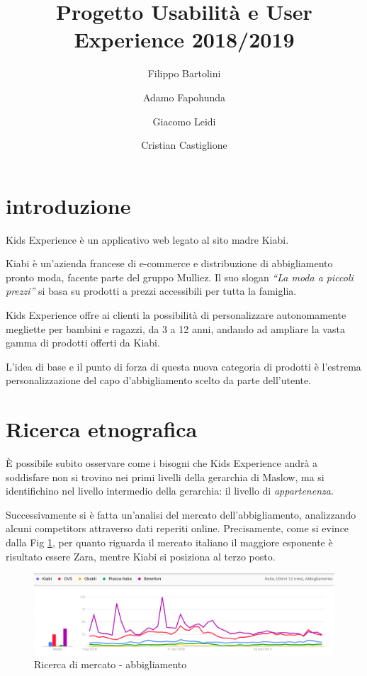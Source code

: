 \documentclass[12pt,italian,]{report}
\title{Progetto Usabilità e User Experience 2018/2019}
\author{Filippo Bartolini \and Adamo Fapohunda \and Giacomo Leidi \and Cristian Castiglione}
\date{}
\begin{document}
\maketitle

{
\setcounter{tocdepth}{2}
\tableofcontents
}
\section{introduzione}\label{introduzione}
Kids Experience è un applicativo web legato al sito madre Kiabi.

Kiabi è un'azienda francese di e-commerce e distribuzione di
abbigliamento pronto moda, facente parte del gruppo Mulliez. Il suo
slogan \emph{``La moda a piccoli prezzi''} si basa su prodotti a prezzi
accessibili per tutta la famiglia.

Kids Experience offre ai clienti la possibilità di personalizzare
autonomamente megliette per bambini e ragazzi, da 3 a 12 anni, andando
ad ampliare la vasta gamma di prodotti offerti da Kiabi.

L'idea di base e il punto di forza di questa nuova categoria di prodotti
è l'estrema personalizzazione del capo d'abbigliamento scelto da parte
dell'utente.
\section{Ricerca etnografica}\label{ricerca-etnografica}
È possibile subito osservare come i bisogni che Kids Experience andrà a
soddisfare non si trovino nei primi livelli della gerarchia di Maslow,
ma si identifichino nel livello intermedio della gerarchia: il livello
di \emph{appartenenza}.

Successivamente si è fatta un'analisi del mercato dell'abbigliamento,
analizzando alcuni competitors attraverso dati reperiti online.
Precisamente, come si evince dalla Fig \ref{abbigliamo_generico}, per quanto riguarda il
mercato italiano il maggiore esponente è risultato essere Zara, mentre Kiabi si
posiziona al terzo posto.

\begin{figure}[h]
\centering
\includegraphics{img/abbigliamento_generico.png}
\caption{Ricerca di mercato - abbigliamento}
\label{abbigliamo_generico}
\end{figure}
\end{document}
